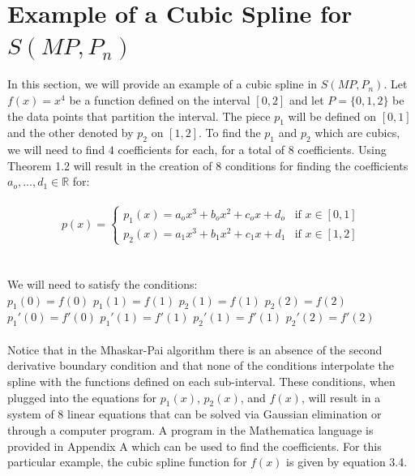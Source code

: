 \section{Example of a Cubic Spline for $S(MP, P_{n})$}
In this section, we will provide an example of a cubic spline in $S(MP, P_{n})$. Let $f(x)=x^4$ be a function defined on the interval $[0,2]$ and let $P=\{0,1,2\}$ be the data points that partition the interval. The piece $p_1$ will be defined on $[0,1]$ and the other denoted by $p_2$ on $[1,2]$. To find the $p_1$ and $p_2$ which are cubics, we will need to find $4$ coefficients for each, for a total of $8$ coefficients. Using Theorem 1.2 will result in the creation of $8$ conditions for finding the coefficients $a_{o},...,d_{1} \in \mathbb{R}$ for:\\\\
\begin{equation}
p(x) = \begin{cases}
p_1(x)= a_{o}x^3+b_{o}x^2+c_{o}x+d_{o} & \text{if } x \in [0,1]\\
p_2(x)= a_{1}x^3+b_{1}x^2+c_{1}x+d_{1} & \text{if } x \in [1,2]
\end{cases}
\end{equation}\\\\
We will need to satisfy the conditions:\\
$p_1(0)=f(0)$\newline
$p_1(1)=f(1)$\newline
$p_2(1)=f(1)$\newline
$p_2(2)=f(2)$\newline
$p_1'(0)=f'(0)$\newline
$p_1'(1)=f'(1)$\newline
$p_2'(1)=f'(1)$\newline
$p_2'(2)=f'(2)$\\\\
Notice that in the Mhaskar-Pai algorithm there is an absence of the second derivative boundary condition and that none of the conditions interpolate the spline with the functions defined on each sub-interval. These conditions, when plugged into the equations for $p_1(x)$, $p_2(x)$, and $f(x)$, will result in a system of $8$ linear equations that can be solved via Gaussian elimination or through a computer program. A program in the Mathematica language is provided in Appendix A which can be used to find the coefficients. For this particular example, the cubic spline function for $f(x)$ is given by equation 3.4.\\\\
